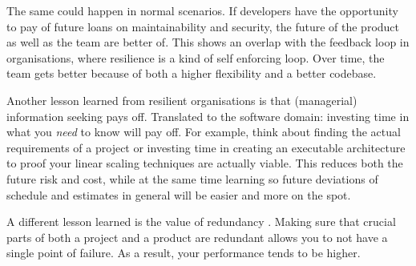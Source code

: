 The same could happen in normal scenarios. 
If developers have the opportunity to pay of future loans on maintainability and security, the future of the product as well as the team are better of. 
This shows an overlap with the feedback loop in organisations, where resilience is a kind of self enforcing loop.
Over time, the team gets better because of both a higher flexibility and a better codebase.

Another lesson learned from resilient organisations is that (managerial) information seeking pays off. 
Translated to the software domain: investing time in what you \emph{need} to know will pay off.
For example, think about finding the actual requirements of a project or investing time in creating an executable architecture to proof your linear scaling techniques are actually viable. 
This reduces both the future risk and cost, while at the same time learning so future deviations of schedule and estimates in general will be easier and more on the spot.

A different lesson learned is the value of redundancy \cite{zhang2010principle}.
Making sure that crucial parts of both a project and a product are redundant allows you to not have a single point of failure. 
As a result, your performance tends to be higher.

